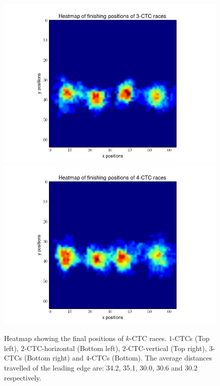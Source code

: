 \documentclass[12pt]{article}
\begin{document}
\begin{figure}[h]
	\includegraphics[scale=0.40]{img/3CTC-final}
	\includegraphics[scale=0.40]{img/4CTC-final}
	\caption{Heatmap showing the final positions of $k$-CTC races. $1$-CTCs (Top left), $2$-CTC-horizontal (Bottom left), $2$-CTC-vertical (Top right), $3$-CTCs (Bottom right) and $4$-CTCs (Bottom). The average distances travelled of the leading edge are: 34.2, 35.1, 30.0, 30.6 and 30.2 respectively. }
	\label{race_end}
\end{figure}
\end{document}
